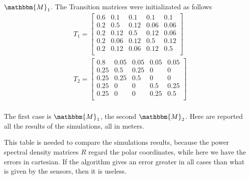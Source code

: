 \documentclass[twocolumn]{article}
\begin{document}
$\mathbbm{M}_{1}$. The Transition matrices were initializated as follows
\begin{align*}
    &T_{1}=\begin{bmatrix}
        0.6&0.1&0.1&0.1&0.1\\
        0.2&0.5&0.12&0.06&0.06\\
        0.2&0.12&0.5&0.12&0.06\\
        0.2&0.06&0.12&0.5&0.12\\
        0.2&0.12&0.06&0.12&0.5\\
    \end{bmatrix}\\
    &T_{2}=\begin{bmatrix}
        0.8&0.05&0.05&0.05&0.05\\
        0.25&0.5&0.25&0&0\\
        0.25&0.25&0.5&0&0\\
        0.25&0&0&0.5&0.25\\
        0.25&0&0&0.25&0.5\\
    \end{bmatrix}
\end{align*}
\\
The first case is $\mathbbm{M}_{1}$, the second $\mathbbm{M}_{2}$. Here are reported all the results of the simulations, all in meters.

\begin{center}
\end{center}
This table is needed to compare the simulations results, because the power spectral density matrices $R$ regard the polar coordinates, while here
 we have the errors in cartesian. If the algorithm gives an error greater in all cases than what is given by the sensors, 
then it is useless. 
\end{document}
